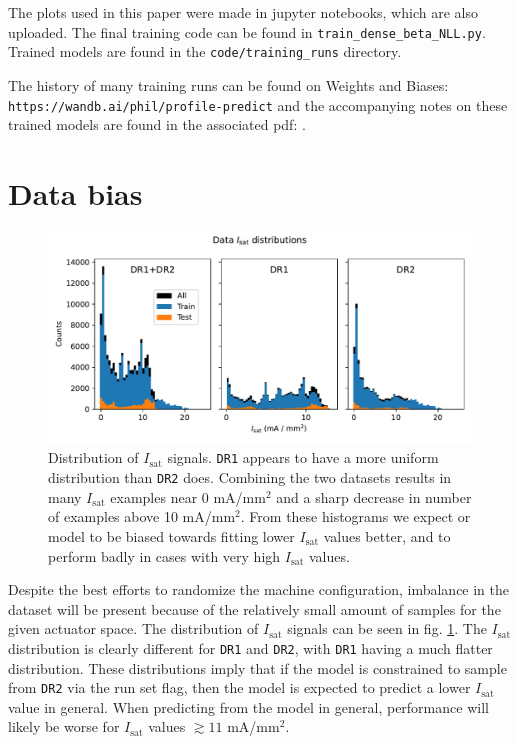 The plots used in this paper were made in jupyter notebooks, which are also uploaded. The final training code can be found in \texttt{train\_dense\_beta\_NLL.py}. Trained models are found in the \texttt{code/training\_runs} directory.

The history of many training runs can be found on Weights and Biases: \texttt{https://wandb.ai/phil/profile-predict} and the accompanying notes on these trained models are found in the associated pdf: .


\section{Data bias \label{sec:app_bias}}

\begin{figure}
	\centering
	\includegraphics[width=\textwidth]{figures/PP1_02_isat_distribution.pdf}
	\caption[size=12]{\label{fig:PP1_02_isat_distribution}Distribution of $I_\text{sat}$ signals. \texttt{DR1} appears to have a more uniform distribution than \texttt{DR2} does. Combining the two datasets results in many $I_\text{sat}$ examples near 0 mA/mm$^2$ and a sharp decrease in number of examples above 10 mA/mm$^2$. From these histograms we expect or model to be biased towards fitting lower $I_\text{sat}$ values better, and to perform badly in cases with very high $I_\text{sat}$ values.}
\end{figure}

Despite the best efforts to randomize the machine configuration, imbalance in the dataset will be present because of the relatively small amount of samples for the given actuator space. The distribution of $I_\text{sat}$ signals can be seen in fig. \ref{fig:PP1_02_isat_distribution}. The $I_\text{sat}$ distribution is clearly different for \texttt{DR1} and \texttt{DR2}, with \texttt{DR1} having a much flatter distribution. These distributions imply that if the model is constrained to sample from \texttt{DR2} via the run set flag, then the model is expected to predict a lower $I_\text{sat}$ value in general. When predicting from the model in general, performance will likely be worse for $I_\text{sat}$ values $\gtrsim 11$ mA/mm$^2$. 

